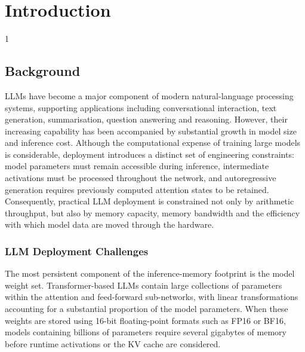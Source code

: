 \doublespacing %

\chapter{Introduction}
\label{ch1}

\begin{spacing}{1} %
\minitoc %
\end{spacing} %
\thesisspacing %


\section{Background}
\label{sec:background}

\acp{LLM} have become a major component of modern natural-language processing systems, supporting applications including conversational interaction, text generation, summarisation, question answering and reasoning. However, their increasing capability has been accompanied by substantial growth in model size and inference cost. Although the computational expense of training large models is considerable, deployment introduces a distinct set of engineering constraints: model parameters must remain accessible during inference, intermediate activations must be processed throughout the network, and autoregressive generation requires previously computed attention states to be retained. Consequently, practical {LLM} deployment is constrained not only by arithmetic throughput, but also by memory capacity, memory bandwidth and the efficiency with which model data are moved through the hardware.


\subsection{{LLM} Deployment Challenges}
\label{subsec:llm-deployment}

The most persistent component of the inference-memory footprint is the model weight set. Transformer-based {LLM}s contain large collections of parameters within the attention and feed-forward sub-networks, with linear transformations accounting for a substantial proportion of the model parameters\cite{vaswani2023attentionneed}. When these weights are stored using 16-bit floating-point formats such as \ac{FP16} or \ac{BF16}, models containing billions of parameters require several gigabytes of memory before runtime activations or the \ac{KV} cache are     considered\cite{grattafiori2024llama3herdmodels}.

